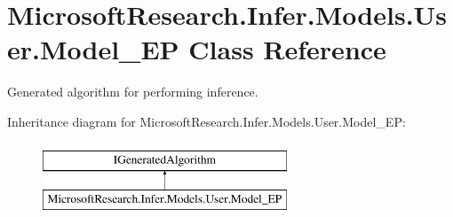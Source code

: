 \hypertarget{class_microsoft_research_1_1_infer_1_1_models_1_1_user_1_1_model___e_p}{}\section{Microsoft\+Research.\+Infer.\+Models.\+User.\+Model\+\_\+\+E\+P Class Reference}
\label{class_microsoft_research_1_1_infer_1_1_models_1_1_user_1_1_model___e_p}


Generated algorithm for performing inference.  


Inheritance diagram for Microsoft\+Research.\+Infer.\+Models.\+User.\+Model\+\_\+\+E\+P\+:\begin{figure}[H]
\begin{center}
\leavevmode
\includegraphics[height=2.000000cm]{class_microsoft_research_1_1_infer_1_1_models_1_1_user_1_1_model___e_p}
\end{center}
\end{figure}
